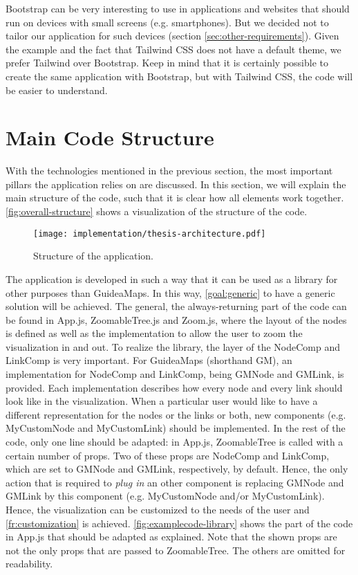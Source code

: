 Bootstrap can be very interesting to use in applications and websites that should run on devices with small screens (e.g. smartphones). But we decided not to tailor our application for such devices (section \ref{sec:other-requirements}). Given the example and the fact that Tailwind CSS does not have a default theme, we prefer Tailwind over Bootstrap. Keep in mind that it is certainly possible to create the same application with Bootstrap, but with Tailwind CSS, the code will be easier to understand.\\





\section{Main Code Structure}\label{sec:structure}
With the technologies mentioned in the previous section, the most important pillars the application relies on are discussed. In this section, we will explain the main structure of the code, such that it is clear how all elements work together. \autoref{fig:overall-structure} shows a visualization of the structure of the code.
\begin{figure}[H]
	\centering
	\texttt{[image: implementation/thesis-architecture.pdf]}
	\caption{Structure of the application.}
	\label{fig:overall-structure}
\end{figure}

The application is developed in such a way that it can be used as a library for other purposes than GuideaMaps. In this way, \ref{goal:generic} to have a generic solution will be achieved. The general, the always-returning part of the code can be found in App.js, ZoomableTree.js and Zoom.js, where the layout of the nodes is defined as well as the implementation to allow the user to zoom the visualization in and out. To realize the library, the layer of the NodeComp and LinkComp is very important. For GuideaMaps (shorthand GM), an implementation for NodeComp and LinkComp, being GMNode and GMLink, is provided. Each implementation describes how every node and every link should look like in the visualization. When a particular user would like to have a different representation for the nodes or the links or both, new components (e.g. MyCustomNode and MyCustomLink) should be implemented. In the rest of the code, only one line should be adapted: in App.js, ZoomableTree is called with a certain number of props. Two of these props are NodeComp and LinkComp, which are set to GMNode and GMLink, respectively, by default. Hence, the only action that is required to \textit{plug in} an other component is replacing GMNode and GMLink by this component (e.g. MyCustomNode and/or MyCustomLink). Hence, the visualization can be customized to the needs of the user and \ref{fr:customization} is achieved. \autoref{fig:examplecode-library} shows the part of the code in App.js that should be adapted as explained. Note that the shown props are not the only props that are passed to ZoomableTree. The others are omitted for readability.\\

